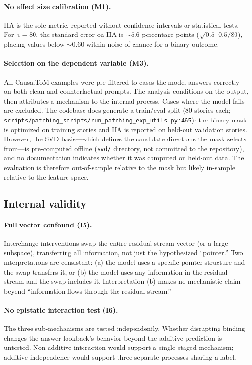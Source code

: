 \documentclass[11pt]{article}
\begin{document}
\paragraph{No effect size calibration (M1).}
IIA is the sole metric, reported without confidence intervals or statistical tests. For $n = 80$, the standard error on IIA is ${\sim}5.6$ percentage points ($\sqrt{0.5 \cdot 0.5 / 80}$), placing values below ${\sim}0.60$ within noise of chance for a binary outcome.

\paragraph{Selection on the dependent variable (M3).}
All CausalToM examples were pre-filtered to cases the model answers correctly on both clean and counterfactual prompts. The analysis conditions on the output, then attributes a mechanism to the internal process. Cases where the model fails are excluded. The codebase does generate a train/eval split (80 stories each; \texttt{scripts/patching\_scripts/run\_patching\_exp\_utils.py:465}): the binary mask is optimized on training stories and IIA is reported on held-out validation stories. However, the SVD basis---which defines the candidate directions the mask selects from---is pre-computed offline (\texttt{svd/} directory, not committed to the repository), and no documentation indicates whether it was computed on held-out data. The evaluation is therefore out-of-sample relative to the mask but likely in-sample relative to the feature space.

\subsection{Internal validity}

\paragraph{Full-vector confound (I5).}
Interchange interventions swap the entire residual stream vector (or a large subspace), transferring all information, not just the hypothesized ``pointer.'' Two interpretations are consistent: (a) the model uses a specific pointer structure and the swap transfers it, or (b) the model uses any information in the residual stream and the swap includes it. Interpretation (b) makes no mechanistic claim beyond ``information flows through the residual stream.''

\paragraph{No epistatic interaction test (I6).}
The three sub-mechanisms are tested independently. Whether disrupting binding changes the answer lookback's behavior beyond the additive prediction is untested. Non-additive interaction would support a single staged mechanism; additive independence would support three separate processes sharing a label.
\end{document}
